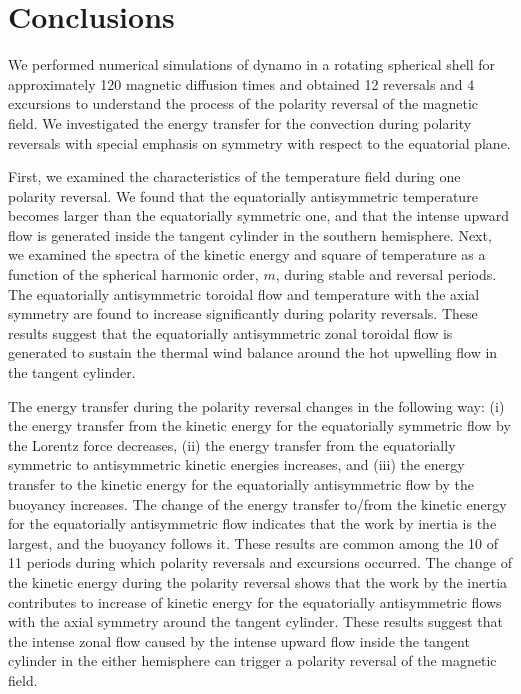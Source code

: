 \section{Conclusions}
\label{section:conclusions}

We performed numerical simulations of dynamo in a rotating spherical shell for approximately %
120 magnetic diffusion times 
and obtained 12 reversals and 4 excursions to understand the process of the polarity reversal of the magnetic field. 
We investigated the energy transfer for the convection during polarity reversals with special emphasis on symmetry with respect to the equatorial plane.

First, we examined the characteristics of the temperature field during one polarity reversal. 
We found that the equatorially antisymmetric temperature becomes larger than the equatorially symmetric one, and that the intense upward flow is generated inside the tangent cylinder in the southern hemisphere. 
Next, we examined the spectra of the kinetic energy and square of temperature as a function of the spherical harmonic order, $m$, %
{\color{teal}
during stable and reversal periods.}
The equatorially antisymmetric toroidal flow and temperature with the axial symmetry are found to increase significantly during polarity reversals.
These results suggest that the equatorially antisymmetric zonal toroidal flow is generated to sustain the thermal wind balance around the hot upwelling flow in the tangent cylinder.

The energy transfer during the polarity reversal changes in the following way: 
(i) the energy transfer from the kinetic energy for the equatorially symmetric flow by the Lorentz force decreases, 
(ii) the energy transfer from the equatorially symmetric to antisymmetric kinetic energies increases, and (iii) the energy transfer to the kinetic energy for the equatorially antisymmetric flow by the buoyancy increases. 
The change of the energy transfer to/from the kinetic energy for the equatorially antisymmetric flow indicates that the work by inertia is the largest, and the buoyancy follows it. 
These results are common among the 10 of 11 periods during which polarity reversals and excursions occurred. 
The change of the kinetic energy during the polarity reversal shows that the work by the inertia contributes to increase of kinetic energy for the equatorially antisymmetric flows with the axial symmetry around the tangent cylinder. 
These results suggest that the intense zonal flow caused by the intense upward flow inside the tangent cylinder in the either hemisphere can trigger a polarity reversal of the magnetic field.

